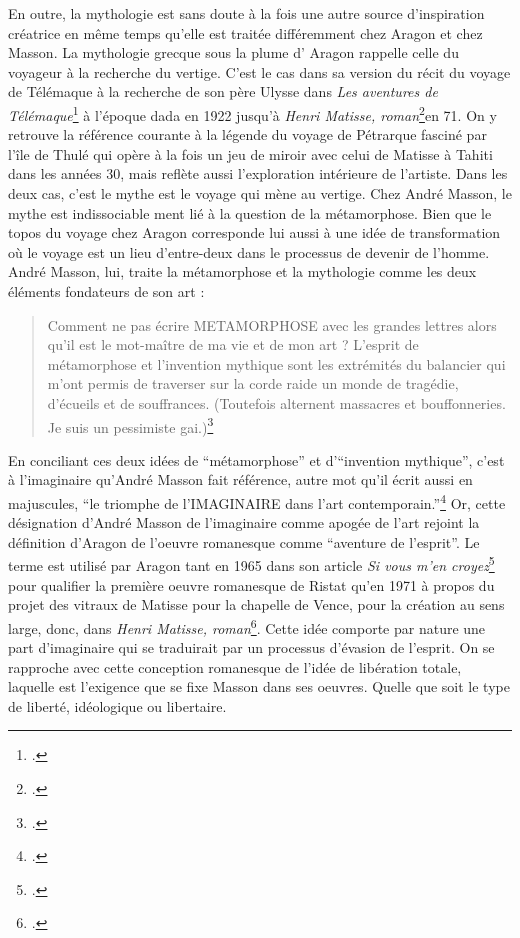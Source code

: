 En outre, la mythologie est sans doute à la fois une autre source d’inspiration créatrice en même temps qu’elle est traitée différemment chez Aragon et chez Masson.  La mythologie grecque sous la plume d’ Aragon rappelle celle du voyageur à la recherche du vertige. C’est le cas dans sa version du récit du voyage de Télémaque à la recherche de son père Ulysse dans \emph{Les aventures de Télémaque}\footcite{telemaque} à l’époque dada en 1922 jusqu’à \emph{Henri Matisse, roman}\footcite{aragonmatisse}en 71. On y retrouve la référence courante à la légende du voyage de Pétrarque fasciné par l’île de Thulé qui opère à la fois un jeu de miroir avec celui de Matisse à Tahiti dans les années 30, mais reflète aussi l’exploration intérieure de l’artiste. Dans les deux cas, c’est le mythe est le voyage qui mène au vertige. Chez André Masson, le mythe est indissociable ment lié à la question de la métamorphose. Bien que le topos du voyage chez Aragon corresponde lui aussi à une idée de transformation où le voyage est un lieu d’entre-deux dans le processus de devenir de l’homme. André Masson, lui, traite la métamorphose et la mythologie comme les deux éléments fondateurs de son art : 
\begin{quote}
Comment ne pas écrire METAMORPHOSE avec les grandes lettres alors qu’il est le mot-maître de ma vie et de mon art ? L’esprit de métamorphose et l’invention mythique sont les extrémités du balancier qui m’ont permis de traverser sur la corde raide un monde de tragédie, d’écueils et de souffrances. (Toutefois alternent massacres et bouffonneries. Je suis un pessimiste gai.)\footcite[p8]{memoiremonde}\end{quote}

En conciliant ces deux idées de \enquote{métamorphose} et d’\enquote{invention mythique}, c’est à l’imaginaire qu’André Masson fait référence, autre mot qu’il écrit aussi en majuscules, \enquote{le triomphe de l’IMAGINAIRE dans l’art contemporain.}\footcite[p19]{rebelle} Or, cette désignation d’André Masson de l’imaginaire comme apogée de l’art rejoint la définition d’Aragon de l’oeuvre romanesque comme \enquote{aventure de l’esprit}. Le terme est utilisé par Aragon tant en 1965 dans son article \emph{Si vous m'en croyez}\footcite[p1]{sivous} pour qualifier la première oeuvre romanesque de Ristat qu'en 1971 à propos du projet des vitraux de Matisse pour la chapelle de Vence, pour la création au sens large, donc, dans \emph{Henri Matisse, roman}\footcite[p643]{aragonmatisse}. Cette idée comporte par nature une part d’imaginaire qui se traduirait par un processus d’évasion de l’esprit. On se rapproche avec cette conception romanesque de l’idée de libération totale, laquelle est l’exigence que se fixe Masson dans ses oeuvres. Quelle que soit le type de liberté, idéologique ou libertaire. 

